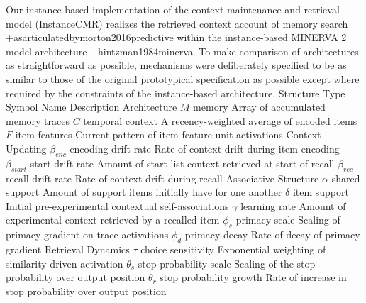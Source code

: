 \markdownRendererInterblockSeparator
{}Our instance-based implementation of the context maintenance and retrieval model (InstanceCMR) realizes the retrieved context account of memory search +{as\markdownRendererNbsp{}articulated\markdownRendererNbsp{}by}{}{morton2016predictive} within the instance-based MINERVA 2 model architecture +{}{}{hintzman1984minerva}. To make comparison of architectures as straightforward as possible, mechanisms were deliberately specified to be as similar to those of the original prototypical specification as possible except where required by the constraints of the instance-based architecture.\markdownRendererInterblockSeparator
{}%
{{Structure Type}%
{Symbol}%
{Name}%
{Description}%
}%
{{Architecture}%
{}%
{}%
{}%
}%
{{}%
{$M$}%
{memory}%
{Array of accumulated memory traces}%
}%
{{}%
{$C$}%
{temporal context}%
{A recency-weighted average of encoded items}%
}%
{{}%
{$F$}%
{item features}%
{Current pattern of item feature unit activations}%
}%
{{Context Updating}%
{}%
{}%
{}%
}%
{{}%
{${\beta}_{enc}$}%
{encoding drift rate}%
{Rate of context drift during item encoding}%
}%
{{}%
{${\beta}_{start}$}%
{start drift rate}%
{Amount of start-list context retrieved at start of recall}%
}%
{{}%
{${\beta}_{rec}$}%
{recall drift rate}%
{Rate of context drift during recall}%
}%
{{Associative Structure}%
{}%
{}%
{}%
}%
{{}%
{${\alpha}$}%
{shared support}%
{Amount of support items initially have for one another}%
}%
{{}%
{${\delta}$}%
{item support}%
{Initial pre-experimental contextual self-associations}%
}%
{{}%
{${\gamma}$}%
{learning rate}%
{Amount of experimental context retrieved by a recalled item}%
}%
{{}%
{${\phi}_{s}$}%
{primacy scale}%
{Scaling of primacy gradient on trace activations}%
}%
{{}%
{${\phi}_{d}$}%
{primacy decay}%
{Rate of decay of primacy gradient}%
}%
{{Retrieval Dynamics}%
{}%
{}%
{}%
}%
{{}%
{${\tau}$}%
{choice sensitivity}%
{Exponential weighting of similarity-driven activation}%
}%
{{}%
{${\theta}_{s}$}%
{stop probability scale}%
{Scaling of the stop probability over output position}%
}%
{{}%
{${\theta}_{r}$}%
{stop probability growth}%
{Rate of increase in stop probability over output position}%
}%
\markdownRendererInterblockSeparator
{}\markdownRendererInterblockSeparator
